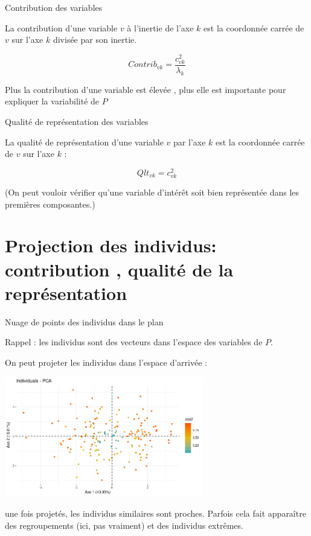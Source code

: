 \documentclass{beamer}
\begin{document}
\begin{frame}{Contribution des variables}

La \alert{contribution} d'une  variable $v$ à l'inertie de l'axe $k$  est la coordonnée carrée  de $v$ sur l'axe $k$ divisée par son inertie.

$$ Contrib_{vk} =\frac{c_{vk}^2}{\lambda_k} $$ 


Plus la contribution d'une variable est élevée , plus elle est importante pour expliquer la variabilité de $P$


\end{frame}


\begin{frame}{Qualité de représentation des variables}

La \alert{qualité de représentation} d'une  variable $v$ par l'axe $k$  est la coordonnée carrée  de $v$ sur l'axe $k$ :

$$Qlt_{vk} = c_{vk}^2$$ 


(On peut vouloir vérifier qu'une variable d'intérêt soit bien représentée dans les premières composantes.)

\end{frame}



\section{Projection des individus: contribution , qualité de la représentation}


\begin{frame}{Nuage de points des individus dans le plan}

Rappel : les individus sont des vecteurs dans l'espace des variables de $P$. 

On peut projeter les individus dans l'espace d'arrivée : 

\begin{center}
\includegraphics[width=0.65\textwidth,keepaspectratio]{img/cercle_trigo_ACP_ind.png}
\end{center}
\begin{spacing}{0.7}
une fois projetés, les individus similaires sont proches.
Parfois cela fait apparaître des regroupements (ici, pas vraiment) et des individus extrêmes.
\end{spacing}

\end{frame}
\end{document}
